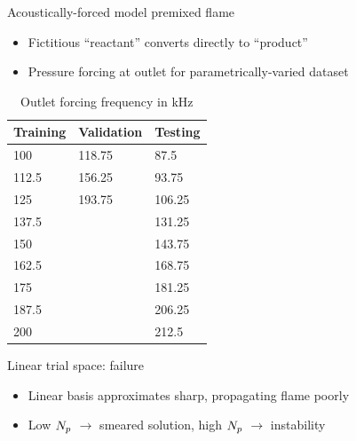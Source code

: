 \documentclass[]{beamer}
\begin{document}
\begin{frame}{Acoustically-forced model premixed flame}
	\begin{itemize}
		\item Fictitious ``reactant'' converts directly to ``product''
		\item Pressure forcing at outlet for parametrically-varied dataset
	\end{itemize}
	\begin{minipage}{0.59\linewidth}
	\end{minipage}
	\begin{minipage}{0.4\linewidth}
		\vspace{1em}
		\scriptsize
		\begin{table}
			\centering
			\begin{tabular}{ lll }
			\toprule
			Training & Validation & Testing  \\
			\midrule
			100   & 118.75 & 87.5 \\
			112.5 & 156.25 & 93.75 \\
			125   & 193.75 & 106.25 \\
			137.5 &        & 131.25 \\
			150   &        & 143.75 \\
			162.5 &        & 168.75 \\
			175   &        & 181.25 \\
			187.5 &        & 206.25 \\
			200   &        & 212.5 \\
			\bottomrule
			\end{tabular}
			\caption*{Outlet forcing frequency in kHz}
		\end{table}
	\end{minipage}
	\normalsize
\end{frame}

\begin{frame}{Linear trial space: failure}
	\begin{itemize}
		\item Linear basis approximates sharp, propagating flame poorly
		\item Low $N_p$ $\rightarrow$ smeared solution, high $N_p$ $\rightarrow$ instability
	\end{itemize}
	\begin{figure}
	\end{figure}
\end{frame}
\end{document}

